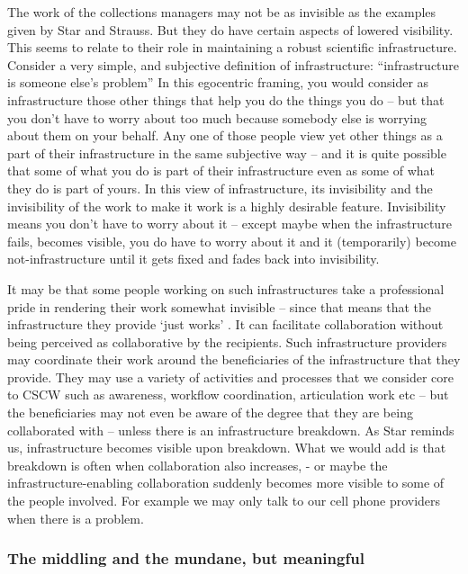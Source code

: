 The work of the collections managers may not be as invisible as the examples given by Star and Strauss. But they do have certain aspects of lowered visibility. This seems to relate to their role in maintaining a robust scientific infrastructure. Consider a very simple, and subjective definition of infrastructure: “infrastructure is someone else’s problem” In this egocentric framing, you would consider as infrastructure those other things that help you do the things you do – but that you don’t have to worry about too much because somebody else is worrying about them on your behalf. Any one of those people view yet other things as a part of their infrastructure in the same subjective way – and it is quite possible that some of what you do is part of their infrastructure even as some of what they do is part of yours. In this view of infrastructure, its invisibility and the invisibility of the work to make it work is a highly desirable feature. Invisibility means you don’t have to worry about it – except maybe when the infrastructure fails, becomes visible, you do have to worry about it and it (temporarily) become not-infrastructure until it gets fixed and fades back into invisibility.

It may be that some people working on such infrastructures take a professional pride in rendering their work somewhat invisible – since that means that the infrastructure they provide ‘just works’ . It can facilitate collaboration without being perceived as collaborative by the recipients. Such infrastructure providers may coordinate their work around the beneficiaries of the infrastructure that they provide. They may use a variety of activities and processes that we consider core to CSCW such as awareness, workflow coordination, articulation work etc – but the beneficiaries may not even be aware of the degree that they are being collaborated with – unless there is an infrastructure breakdown. As Star reminds us, infrastructure becomes visible upon breakdown. What we would add is that breakdown is often when collaboration also increases, - or maybe the infrastructure-enabling collaboration suddenly becomes more visible to some of the people involved. For example we may only talk to our cell phone providers when there is a problem.

\subsubsection{The middling and the mundane, but meaningful}

